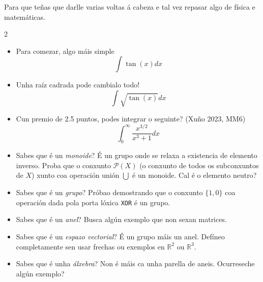 
Para que teñas que darlle varias voltas á cabeza e tal vez repasar algo de
física e matemáticas.

\begin{multicols}{2}

\begin{itemize}
    \item Para comezar, algo máis simple
        \[ \int \tan(x) dx \]
    \item Unha raíz cadrada pode cambialo todo!
        \[ \int \sqrt{\tan(x)} dx \]
    \item Cun premio de 2.5 puntos, podes integrar o seguinte? (Xuño 2023, MM6)
        \[ \int_0^\infty \frac{x^{3/2}}{x^3 +1} dx \]
\end{itemize}

\goodbreak

\begin{itemize}
    \itemsep0em
    \item Sabes que é un \emph{monoide}? É un grupo onde se relaxa a
        existencia de elemento inverso. Proba que o conxunto \(\mathcal{P}(X)\)
        (o conxunto de todos os subconxuntos de $X$) xunto coa operación unión
        \(\bigcup\) é un monoide. Cal é o elemento neutro?
    \item Sabes que é un \emph{grupo}? Próbao demostrando que o conxunto
        \(\{1,0\}\) coa operación dada pola porta lóxica \texttt{XOR} é un
        grupo.
    \item Sabes que é un \emph{anel}? Busca algún exemplo que non sexan matrices.
    \item Sabes que é un \emph{espazo vectorial}? É un grupo máis un anel.
        Defíneo completamente sen usar frechas ou exemplos en \(\mathbb{R}^2\) ou
        \(\mathbb{R}^3\).
    \item Sabes que é unha \emph{álxebra}? Non é máis ca unha parella de aneis.
        Ocurreseche algún exemplo?
\end{itemize}

\end{multicols}


